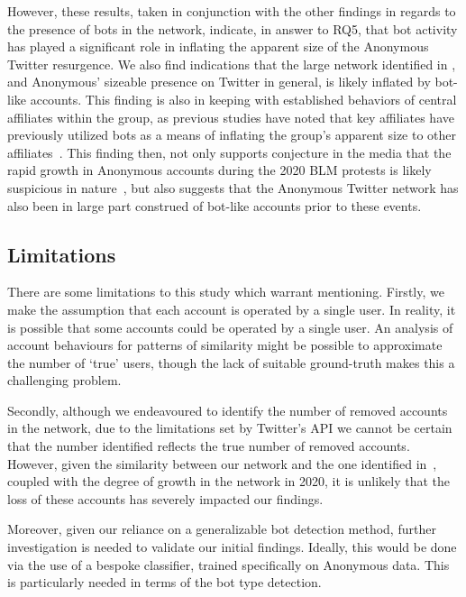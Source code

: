 \documentclass[letterpaper]{article}
\begin{document}
However, these results, taken in conjunction with the other findings in regards to the presence of bots in the network, indicate, in answer to RQ5, that bot activity has played a significant role in inflating the apparent size of the Anonymous Twitter resurgence. We also find indications that the large network identified in \cite{Jones2020}, and Anonymous' sizeable presence on Twitter in general, is likely inflated by bot-like accounts. This finding is also in keeping with established behaviors of central affiliates within the group, as previous studies have noted that key affiliates have previously utilized bots as a means of inflating the group's apparent size to other affiliates~\cite{Olson2013}. This finding then, not only supports conjecture in the media that the rapid growth in Anonymous accounts during the 2020 BLM protests is likely suspicious in nature~\cite{Telegraph2020}, but also suggests that the Anonymous Twitter network has also been in large part construed of bot-like accounts prior to these events.

\subsection{Limitations}

There are some limitations to this study which warrant mentioning. Firstly, we make the assumption that each account is operated by a single user. In reality, it is possible that some accounts could be operated by a single user. An analysis of account behaviours for patterns of similarity might be possible to approximate the number of `true' users, though the lack of suitable ground-truth makes this a challenging problem.

Secondly, although we endeavoured to identify the number of removed accounts in the network, due to the limitations set by Twitter's API we cannot be certain that the number identified reflects the true number of removed accounts. However, given the similarity between our network and the one identified in~\cite{Jones2020}, coupled with the degree of growth in the network in 2020, it is unlikely that the loss of these accounts has severely impacted our findings.

Moreover, given our reliance on a generalizable bot detection method, further investigation is needed to validate our initial findings. Ideally, this would be done via the use of a bespoke classifier, trained specifically on Anonymous data. This is particularly needed in terms of the bot type detection.
\end{document}
